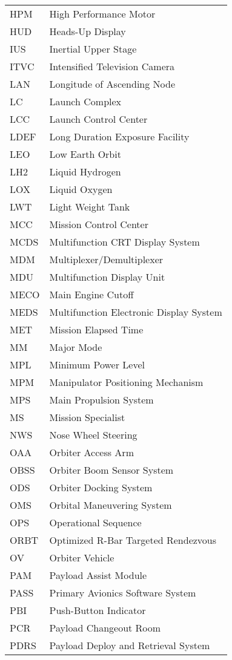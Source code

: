 \documentclass[Space_Shuttle_Vessel_Manual.tex]{subfiles}
\begin{document}
\begin{longtable}{l l }
HPM & High Performance Motor\\
HUD & Heads-Up Display\\
IUS & Inertial Upper Stage\\
ITVC & Intensified Television Camera\\
LAN & Longitude of Ascending Node\\
LC & Launch Complex\\
LCC & Launch Control Center\\
LDEF & Long Duration Exposure Facility\\
LEO & Low Earth Orbit\\
LH2 & Liquid Hydrogen\\
LOX & Liquid Oxygen\\
LWT & Light Weight Tank\\
MCC & Mission Control Center\\
MCDS & Multifunction CRT Display System\\
MDM & Multiplexer/Demultiplexer\\
MDU & Multifunction Display Unit\\
MECO & Main Engine Cutoff\\
MEDS & Multifunction Electronic Display System\\
MET & Mission Elapsed Time\\
MM & Major Mode\\
MPL & Minimum Power Level\\
MPM & Manipulator Positioning Mechanism\\
MPS & Main Propulsion System\\
MS & Mission Specialist\\
NWS & Nose Wheel Steering\\
OAA & Orbiter Access Arm\\
OBSS & Orbiter Boom Sensor System\\
ODS & Orbiter Docking System\\
OMS & Orbital Maneuvering System\\
OPS & Operational Sequence\\
ORBT & Optimized R-Bar Targeted Rendezvous\\
OV & Orbiter Vehicle\\
PAM & Payload Assist Module\\
PASS & Primary Avionics Software System\\
PBI & Push-Button Indicator\\
PCR & Payload Changeout Room\\
PDRS & Payload Deploy and Retrieval System\\

\end{longtable}
\end{document}
